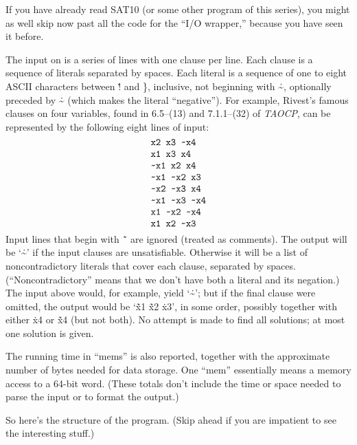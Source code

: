 If you have already read {\mc SAT10} (or some other program of this
series), you might as well skip now past all the code for the
``I/O wrapper,'' because you have seen it before.

The input on  is a series of lines with one clause per line. Each
clause is a sequence of literals separated by spaces. Each literal is
a sequence of one to eight ASCII characters between \.{!} and \.{\}},
inclusive, not beginning with \.{\~},
optionally preceded by \.{\~} (which makes the literal ``negative'').
For example, Rivest's famous clauses on four variables,
found in 6.5--(13) and 7.1.1--(32) of {\sl TAOCP}, can be represented by the
following eight lines of input:
$$\chardef~=`\~
\vcenter{\halign{\tt#\cr
x2 x3 ~x4\cr
x1 x3 x4\cr
~x1 x2 x4\cr
~x1 ~x2 x3\cr
~x2 ~x3 x4\cr
~x1 ~x3 ~x4\cr
x1 ~x2 ~x4\cr
x1 x2 ~x3\cr}}$$
Input lines that begin with \.{\~\ } are ignored (treated as comments).
The output will be `\.{\~}' if the input clauses are unsatisfiable.
Otherwise it will be a list of noncontradictory literals that cover each
clause, separated by spaces. (``Noncontradictory'' means that we don't
have both a literal and its negation.) The input above would, for example,
yield `\.{\~}'; but if the final clause were omitted, the output would
be `\.{\~x1} \.{\~x2} \.{x3}', in some order, possibly together
with either \.{x4} or \.{\~x4} (but not both). No attempt is made to
find all solutions; at most one solution is given.

The running time in ``mems'' is also reported, together with the approximate
number of bytes needed for data storage. One ``mem'' essentially means a
memory access to a 64-bit word.
(These totals don't include the time or space needed to parse the
input or to format the output.)

\fi

So here's the structure of the program. (Skip ahead if you are
impatient to see the interesting stuff.)

